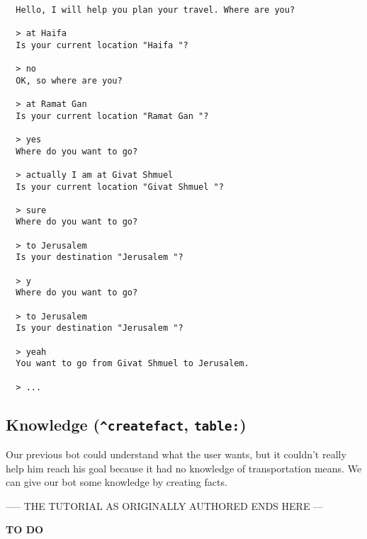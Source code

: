 \documentclass[]{article}
\begin{document}
\begin{verbatim}

  Hello, I will help you plan your travel. Where are you?

  > at Haifa
  Is your current location "Haifa "?

  > no
  OK, so where are you?

  > at Ramat Gan
  Is your current location "Ramat Gan "?

  > yes
  Where do you want to go?

  > actually I am at Givat Shmuel
  Is your current location "Givat Shmuel "?

  > sure
  Where do you want to go?

  > to Jerusalem
  Is your destination "Jerusalem "?

  > y
  Where do you want to go?

  > to Jerusalem
  Is your destination "Jerusalem "?

  > yeah
  You want to go from Givat Shmuel to Jerusalem.

  > ...
\end{verbatim}

\subsection{\texorpdfstring{Knowledge (\texttt{\^{}createfact},
\texttt{table:})}{Knowledge (\^{}createfact, table:)}}\label{knowledge-createfact-table}

Our previous bot could understand what the user wants, but it couldn't
really help him reach his goal because it had no knowledge of
transportation means. We can give our bot some knowledge by creating
facts.

----- THE TUTORIAL AS ORIGINALLY AUTHORED ENDS HERE ---

\textbf{TO DO}
\end{document}
